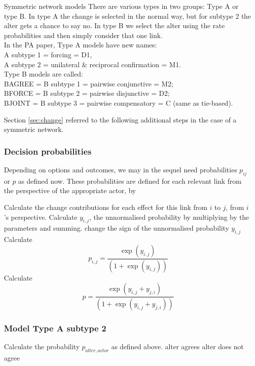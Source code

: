 \documentclass[12pt,a4paper]{article}
\makeatletter
\renewcommand{\=}{\,=\,}
\newcommand{\+}{\,+\,}
\renewcommand{\subsection}{\@startsection{subsection}{2}
                {0pt}{0.7\baselineskip}{0.3\baselineskip}
                {\sffamily} }
\makeatother
\begin{document}
\subsection{Symmetric network models}
There are various types in two groups: Type A or type B. In type A the change
is selected in the normal way, but for subtype 2 the alter gets a chance to
say no. In type B we select the alter using the rate probabilities and then
simply consider that one link.\\
In the PA paper, Type A models have new names:\\
A subtype 1 = forcing = D1,\\
A subtype 2 = unilateral \& reciprocal confirmation = M1.\\
Type B models are called:\\
BAGREE = B subtype 1 = pairwise conjunctive = M2;\\
BFORCE = B subtype 2 = pairwise disjunctive = D2;\\
BJOINT = B subtype 3 = pairwise compensatory = C (same as tie-based).
\par
Section \ref{sec:change} referred to the following additional
steps in the case of a symmetric network.
\subsubsection{Decision probabilities}
Depending on options and outcomes, we may in the sequel
need probabilities $p_{ij}$ or $p$ as defined now.
These probabilities are defined for each relevant link from the
perspective of the appropriate actor, by
\begin{algorithmic}
\STATE Calculate the change contributions for each effect for this link from
$i$ to $j$, from $i$'s perspective.
\STATE Calculate $y_{i,j}$, the unnormalised probability by multiplying by the
parameters and summing.
\STATE change the sign of the unnormalised probability $y_{i,j}$
\ENDIF
{}
\STATE Calculate $$p_{i,j} = \frac{\exp(y_{i,j})} { (1 + \exp(y_{i,j}))}$$
\ELSE
\STATE Calculate $$p = \frac{\exp(y_{i,j} + y_{j,i})}
{(1 + \exp(y_{i,j} + y_{j,i}))}$$
\ENDIF
\end{algorithmic}
\subsubsection{Model Type A subtype 2}
\label{sec:alterSymA}
\begin{algorithmic}
\STATE Calculate the probability $p_{alter, actor}$ as defined above.
\STATE alter agrees
\ELSE
\STATE alter does not agree
\ENDIF
\ENDIF
\end{algorithmic}
\end{document}
